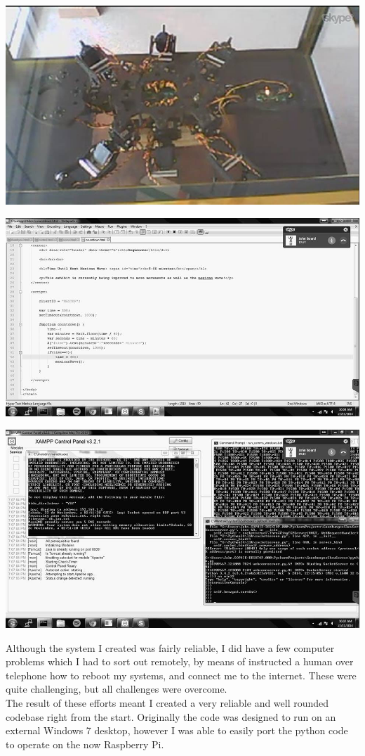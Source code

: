 		\centerline{\includegraphics[width=0.75\linewidth]{images/goombungee_skype}}
		\vspace{5pt}
		\centerline{\includegraphics[width=0.75\linewidth]{images/goombungee_js}}
		\vspace{5pt}
		\centerline{\includegraphics[width=0.75\linewidth]{images/goombungee_teamviewer}}
		\pagebreak
		
		Although the system I created was fairly reliable, I did have a few computer problems which I had to sort out remotely, by means of instructed a human over telephone how to reboot my systems, and connect me to the internet. These were quite challenging, but all challenges were overcome.\\
		
		The result of these efforts meant I created a very reliable and well rounded codebase right from the start. Originally the code was designed to run on an external Windows 7 desktop, however I was able to easily port the python code to operate on the now Raspberry Pi.\\
		
